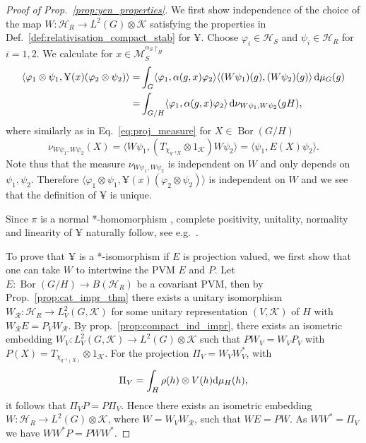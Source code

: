 \documentclass[sn-mathphys-num]{sn-jnl}%
\newcommand{\HH}{\mathcal{H}}
\newcommand{\KK}{\mathcal{K}}
\newcommand{\MM}{\mathcal{M}}
\DeclareMathOperator{\Bor}{Bor}
\newcommand{\diff}{\textup{d}}
\numberwithin{equation}{section}
\theoremstyle{thmstyleone}%
\theoremstyle{thmstyletwo}%
\theoremstyle{thmstylethree}%
\begin{document}
    \begin{proof}[Proof of Prop.\ \ref{prop:yen_properties}]
        We first show independence of the choice of the map $W:\HH_R\to L^2(G)\otimes \KK$ satisfying the properties in Def.\ \ref{def:relativisation_compact_stab} for $\yen$. Choose $\varphi_i\in \HH_S$ and $\psi_i\in \HH_R$ for $i=1,2$. We calculate for $x\in \MM_S^{\alpha_S\restriction_H}$
        \begin{align}
            \langle \varphi_1\otimes \psi_1,\yen(x)(\varphi_2\otimes \psi_2)\rangle=&\int_G \langle\varphi_1,\alpha(g,x)\varphi_2\rangle\langle (W\psi_1)(g),(W\psi_2)(g)\rangle\,\diff\mu_G(g)\nonumber\\
            =&\int_{G/H} \langle\varphi_1,\alpha(g,x)\varphi_2\rangle\,\diff\nu_{W\psi_1,W\psi_2}(gH),
        \end{align}
        where similarly as in Eq.\ \eqref{eq:proj_measure} for $X\in \Bor(G/H)$
        \begin{equation}
            \nu_{W\psi_1,W\psi_2}(X)=\langle W\psi_1,(T_{\chi_{q^{-1}X}}\otimes 1_\KK)W\psi_2\rangle=\langle \psi_1,E(X)\psi_2\rangle.
        \end{equation}
        Note thus that the measure $\nu_{W\psi_1,W\psi_2}$ is independent on $W$ and only depends on $\psi_1,\psi_2$. Therefore $\langle \varphi_1\otimes \psi_1,\yen(x)(\varphi_2\otimes \psi_2)\rangle$ is independent on $W$ and we see that the definition of $\yen$ is unique.

        Since $\pi$ is a normal *-homomorphism \cite[Prop.\ 2.5]{vanDaele:1978}, complete positivity, unitality, normality and linearity of $\yen$ naturally follow, see e.g.\ \cite[Thm.\ IV.3.6]{Takesaki2001}.
        
         To prove that $\yen$ is a *-isomorphism if $E$ is projection valued, we first show that one can take $W$ to intertwine the PVM $E$ and $P$. Let $E:\Bor(G/H)\to B(\HH_R)$ be a covariant PVM, then by Prop.\ \ref{prop:cat_impr_thm} there exists a unitary isomorphism $W_{\mathcal{R}}:\HH_R\to L_V^2(G,\KK)$ for some unitary representation $(V,\KK)$ of $H$ with $W_{\mathcal{R}}E=P_VW_{\mathcal{R}}$. By prop.\ \ref{prop:compact_ind_impr}, there exists an isometric embedding $W_V:L_V^2(G,\KK)\to L^2(G)\otimes\KK$ such that $PW_{V}=W_{V}P_V$ with $P(X)=T_{\chi_{q^{-1}(X)}}\otimes 1_{\KK}$. For the projection $\Pi_V=W_VW_V^*$,
        with
        \begin{equation}
            \Pi_V=\int_H\rho(h)\otimes V(h)\diff\mu_H(h),
        \end{equation}
        it follows that $\Pi_VP=P\Pi_V$. Hence there exists an isometric embedding $W:\HH_R\to L^2(G)\otimes\KK$, where $W=W_VW_\mathcal{R}$, such that $WE=PW$. As $WW^*=\Pi_V$ we have $WW^*P=PWW^*$.
        

\end{proof}
\end{document}
